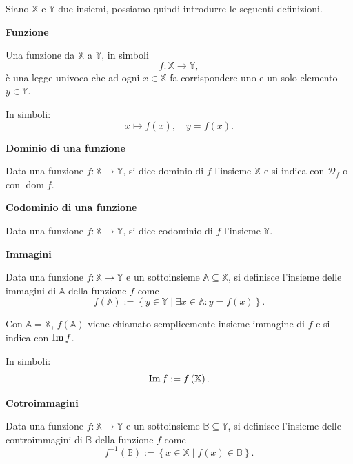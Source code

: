Siano $\mathbb{X}$ e $\mathbb{Y}$ due insiemi, possiamo quindi introdurre le seguenti definizioni.

\begin{definition}
    \textbf{Funzione}

    Una funzione da $\mathbb{X}$ a $\mathbb{Y}$, in simboli
    \[ f:\mathbb{X}\rightarrow\mathbb{Y}, \]
    è una legge univoca che ad ogni $x\in\mathbb{X}$ fa corrispondere uno e un solo elemento $y\in\mathbb{Y}$.
    
    In simboli:
    \[ x \mapsto f\left(x\right), \quad y = f\left(x\right). \]
\end{definition}

\begin{definition}
    \textbf{Dominio di una funzione}

    Data una funzione $f:\mathbb{X}\rightarrow\mathbb{Y}$,
    si dice dominio di $f$ l'insieme $\mathbb{X}$ e si indica con $\mathscr{D}_f$ o con
    $\operatorname{dom}f$.
\end{definition}

\begin{definition}
    \textbf{Codominio di una funzione}

    Data una funzione $f:\mathbb{X}\rightarrow\mathbb{Y}$,
    si dice codominio di $f$ l'insieme $\mathbb{Y}$.
\end{definition}

\begin{definition}
    \textbf{Immagini}

    Data una funzione $f:\mathbb{X}\rightarrow\mathbb{Y}$ e un sottoinsieme
    $\mathbb{A} \subseteq \mathbb{X}$, si definisce l'insieme delle immagini di $\mathbb{A}$ della funzione $f$ come
    \[ f\left(\mathbb{A}\right) := \left\{ y\in\mathbb{Y} \mid \exists x\in\mathbb{A} : y=f\left(x\right)\right\}. \]

    Con $\mathbb{A} = \mathbb{X}$, $f\left(\mathbb{A}\right)$ viene chiamato semplicemente
    insieme immagine di $f$ e si indica con $\operatorname{Im}f$.
    
    In simboli:
    \[ \operatorname{Im}f := f\left(\mathbb{X}\right). \]
\end{definition}

\begin{definition}
    \textbf{Cotroimmagini}

    Data una funzione $f:\mathbb{X}\rightarrow\mathbb{Y}$ e un sottoinsieme
    $\mathbb{B} \subseteq \mathbb{Y}$, si definisce l'insieme delle controimmagini di
    $\mathbb{B}$ della funzione $f$ come
    \[
        f^{-1}\left(\mathbb{B}\right) := \left\{
            x\in\mathbb{X} \mid f\left(x\right)\in\mathbb{B}
        \right\}.
    \]
\end{definition}

